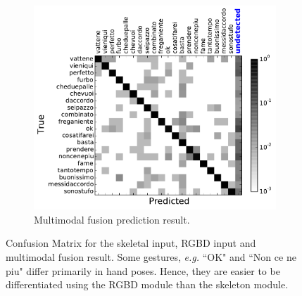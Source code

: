 \begin{figure}[t]
        ~ %
        \begin{subfigure}[c]{0.36\textwidth}
                \includegraphics[width=\textwidth]{images/cm/cm_combination}
                \caption{Multimodal fusion prediction result.}
                \label{fusion_cm}
        \end{subfigure}

  \caption{Confusion Matrix for the skeletal input, RGBD input and multimodal fusion result.
  Some gestures, \emph{e.g.} ``OK" and ``Non ce ne piu" differ primarily in hand poses. Hence, they are easier to be differentiated using the RGBD module than the skeleton module.
  }\label{confusion_matrix}
\end{figure}

